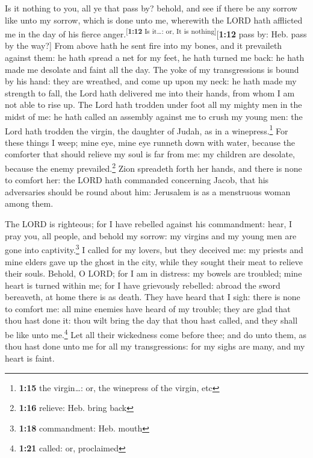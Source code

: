  Is it nothing to you, all ye that pass by? behold, and
see if there be any sorrow like unto my sorrow, which is done unto me,
wherewith the LORD hath afflicted me in the day of his fierce
anger.\textsuperscript{{[}\textbf{1:12} Is it\ldots: or, It is
nothing{]}}{[}\textbf{1:12} pass by: Heb. pass by the way?{]}
 From above hath he sent fire into my bones, and it
prevaileth against them: he hath spread a net for my feet, he hath
turned me back: he hath made me desolate and faint all the day.
 The yoke of my transgressions is bound by his hand: they
are wreathed, and come up upon my neck: he hath made my strength to
fall, the Lord hath delivered me into their hands, from whom I am not
able to rise up.  The Lord hath trodden under foot all my
mighty men in the midst of me: he hath called an assembly against me to
crush my young men: the Lord hath trodden the virgin, the daughter of
Judah, as in a winepress.\footnote{\textbf{1:15} the virgin\ldots: or,
  the winepress of the virgin, etc}  For these things I
weep; mine eye, mine eye runneth down with water, because the comforter
that should relieve my soul is far from me: my children are desolate,
because the enemy prevailed.\footnote{\textbf{1:16} relieve: Heb. bring
  back}  Zion spreadeth forth her hands, and there is
none to comfort her: the LORD hath commanded concerning Jacob, that his
adversaries should be round about him: Jerusalem is as a menstruous
woman among them.

 The LORD is righteous; for I have rebelled against his
commandment: hear, I pray you, all people, and behold my sorrow: my
virgins and my young men are gone into captivity.\footnote{\textbf{1:18}
  commandment: Heb. mouth}  I called for my lovers, but
they deceived me: my priests and mine elders gave up the ghost in the
city, while they sought their meat to relieve their souls.
 Behold, O LORD; for I am in distress: my bowels are
troubled; mine heart is turned within me; for I have grievously
rebelled: abroad the sword bereaveth, at home there is as death.
 They have heard that I sigh: there is none to comfort
me: all mine enemies have heard of my trouble; they are glad that thou
hast done it: thou wilt bring the day that thou hast called, and they
shall be like unto me.\footnote{\textbf{1:21} called: or, proclaimed}
 Let all their wickedness come before thee; and do unto
them, as thou hast done unto me for all my transgressions: for my sighs
are many, and my heart is faint.

